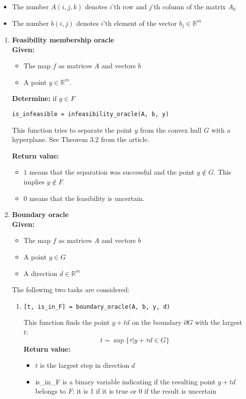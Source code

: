 \documentclass[a4paper]{article}
\newcommand{\R}{\mathbb{R}}
\theoremstyle{definition}
\begin{document}
\begin{itemize}
\item The number $A(i, j, k)$ denotes $i$'th row and $j$'th column of the matrix $A_k$
\item The number $b(i, j)$ denotes $i$'th element of the vector $b_j\in\mathbb{R}^m$
\end{itemize}

\begin{enumerate}
\item {\bf Feasibility membership oracle}\\
{\bf Given:}
\begin{itemize}
\item The map $f$ as matrices $A$ and vectors $b$
\item A point $y\in\mathbb{R}^m$.
\end{itemize}
{\bf Determine:} if $y\in F$
\begin{verbatim}
is_infeasible = infeasibility_oracle(A, b, y)
\end{verbatim}
This function tries to separate the point $y$ from the convex hull $G$ with a hyperplane. See Theorem 3.2 from the article.

{\bf Return value:}
\begin{itemize}
\item $1$ means that the separation was successful and the point $y\notin G$. This implies $y\notin F$.
\item $0$ means that the feasibility is uncertain.
\end{itemize}

\item {\bf Boundary oracle}\\
{\bf Given:}
\begin{itemize}
	\item The map $f$ as matrices $A$ and vectors $b$
	\item A point $y\in G$
	\item A direction $d\in\R^m$
\end{itemize}
The following two tasks are considered:
\begin{enumerate}
\item \begin{verbatim}
[t, is_in_F] = boundary_oracle(A, b, y, d)
\end{verbatim}
This function finds the point $y+td$ on the boundary $\partial G$ with the largest $t$:
$$t = \sup\{\tau\big| y+\tau d\in G\}$$
{\bf Return value:}
\begin{itemize}
	\item $t$ is the largest step in direction $d$
	\item is\_in\_F is a binary variable indicating if the resulting point $y+td$ belongs to $F$: it is 1 if it is true or 0 if the result is uncertain
\end{itemize}


\end{enumerate}
\end{enumerate}
\end{document}
